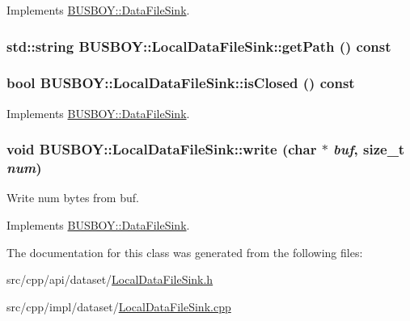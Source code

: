 Implements \hyperlink{classBUSBOY_1_1DataFileSink_a353efcd57a43050fce1549d0be463b14}{BUSBOY::DataFileSink}.\hypertarget{classBUSBOY_1_1LocalDataFileSink_a7b446b6a66e768ed819b6fc71e93c934}{
\subsubsection[{getPath}]{\setlength{\rightskip}{0pt plus 5cm}std::string BUSBOY::LocalDataFileSink::getPath () const}}
\label{classBUSBOY_1_1LocalDataFileSink_a7b446b6a66e768ed819b6fc71e93c934}
\hypertarget{classBUSBOY_1_1LocalDataFileSink_aaf46e7aa06db39f9a702cae3054c58e3}{
\subsubsection[{isClosed}]{\setlength{\rightskip}{0pt plus 5cm}bool BUSBOY::LocalDataFileSink::isClosed () const}}
\label{classBUSBOY_1_1LocalDataFileSink_aaf46e7aa06db39f9a702cae3054c58e3}


Implements \hyperlink{classBUSBOY_1_1DataFileSink_a0c3277901c45d1476b7b2cb8bc67664e}{BUSBOY::DataFileSink}.\hypertarget{classBUSBOY_1_1LocalDataFileSink_a97aee92204860bb3f433f8b1520fd93b}{
\subsubsection[{write}]{\setlength{\rightskip}{0pt plus 5cm}void BUSBOY::LocalDataFileSink::write (char $\ast$ {\em buf}, \/  size\_\-t {\em num})}}
\label{classBUSBOY_1_1LocalDataFileSink_a97aee92204860bb3f433f8b1520fd93b}


Write num bytes from buf. 

Implements \hyperlink{classBUSBOY_1_1DataFileSink_a5db7ff2ea8f54f197a99261a63fd2f9a}{BUSBOY::DataFileSink}.

The documentation for this class was generated from the following files:\begin{DoxyCompactItemize}
\item 
src/cpp/api/dataset/\hyperlink{LocalDataFileSink_8h}{LocalDataFileSink.h}\item 
src/cpp/impl/dataset/\hyperlink{LocalDataFileSink_8cpp}{LocalDataFileSink.cpp}\end{DoxyCompactItemize}

